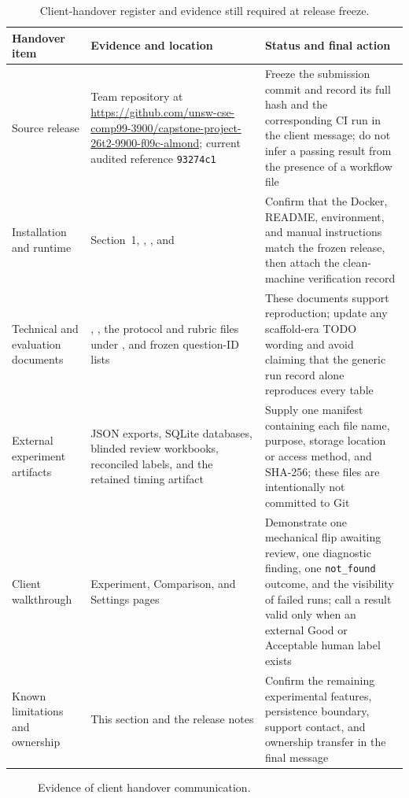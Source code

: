 \documentclass[11pt,a4paper]{article}
\begin{document}
\begin{table}[!htbp]
\centering
\footnotesize
\begin{tabularx}{\textwidth}{@{}L{2.7cm}Y Y@{}}
\toprule
\textbf{Handover item} & \textbf{Evidence and location} & \textbf{Status and final action} \\
\midrule
Source release & Team repository at
\url{https://github.com/unsw-cse-comp99-3900/capstone-project-26t2-9900-f09c-almond};
current audited reference \texttt{93274c1} & Freeze the submission commit and record
its full hash and the corresponding CI run in the client message; do not infer a
passing result from the presence of a workflow file \\
Installation and runtime & Section~1, ,
, and  & Confirm that the
Docker, README, environment, and manual instructions match the frozen release, then
attach the clean-machine verification record \\
Technical and evaluation documents & ,
, the protocol and rubric files under
, and frozen question-ID lists & These documents support
reproduction; update any scaffold-era TODO wording and avoid claiming that the generic
run record alone reproduces every table \\
External experiment artifacts & JSON exports, SQLite databases, blinded review
workbooks, reconciled labels, and the retained timing artifact & Supply one manifest
containing each file name, purpose, storage location or access method, and SHA-256;
these files are intentionally not committed to Git \\
Client walkthrough & Experiment, Comparison, and Settings pages & Demonstrate one
mechanical flip awaiting review, one diagnostic finding, one \texttt{not\_found}
outcome, and the visibility of failed runs; call a result valid only when an external
Good or Acceptable human label exists \\
Known limitations and ownership & This section and the release notes & Confirm the
remaining experimental features, persistence boundary, support contact, and ownership
transfer in the final message \\
\bottomrule
\end{tabularx}
\caption{Client-handover register and evidence still required at release freeze.}
\label{tab:handover}
\end{table}

\begin{figure}[htbp]
\centering
{}
\caption{Evidence of client handover communication.}
\label{fig:handover}
\end{figure}
\end{document}
